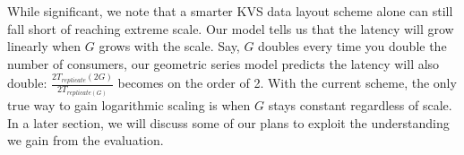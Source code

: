 While significant, we note that a smarter KVS data layout scheme alone
can still fall short of reaching extreme scale. Our model tells us that the latency
will grow linearly when $G$ grows with the scale. 
Say, $G$ doubles every time you double the number of consumers, our geometric series
model predicts the latency will also double:
$\frac{2T_{replicate}(2G)}{2T_{replicate(G)}}$ becomes 
on the order of 2. With the current scheme, the only true way to gain logarithmic
scaling is when $G$ stays constant regardless of scale. 
In a later section, we will discuss some of our plans 
to exploit the understanding we gain from the evaluation. 



